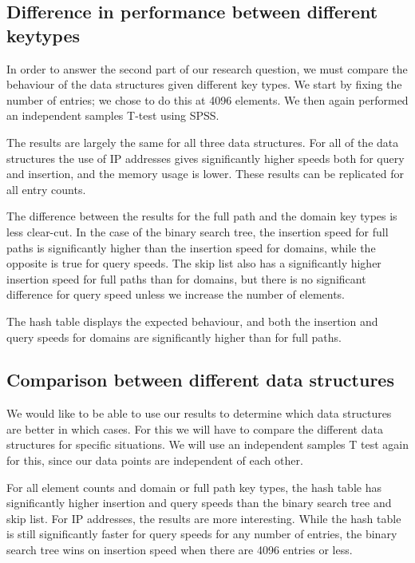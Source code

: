 \documentclass[12pt,a4paper]{article}
\begin{document}
    \subsection{Difference in performance between different keytypes}

    In order to answer the second part of our research question, we must compare the behaviour of
    the data structures given different key types.  We start by fixing the number of entries; we
    chose to do this at 4096 elements.  We then again performed an independent samples T-test
    using SPSS.

    The results are largely the same for all three data structures. For all of the data structures
    the use of IP addresses gives significantly higher speeds both for query and insertion, and the
    memory usage is lower.  These results can be replicated for all entry counts.

    The difference between the results for the full path and the domain key types is less clear-cut.
    In the case of the binary search tree, the insertion speed for full paths is significantly higher
    than the insertion speed for domains, while the opposite is true for query speeds.  The skip
    list also has a significantly higher insertion speed for full paths than for domains, but there
    is no significant difference for query speed unless we increase the number of elements.

    The hash table displays the expected behaviour, and both the insertion and query speeds for
    domains are significantly higher than for full paths.

    \subsection{Comparison between different data structures}

    We would like to be able to use our results to determine which data structures are better in
    which cases.  For this we will have to compare the different data structures for specific
    situations. We will use an independent samples T test again for this, since our data points are
    independent of each other.

    For all element counts and domain or full path key types, the hash table has significantly higher insertion
    and query speeds than the binary search tree and skip list.  For IP addresses, the results are
    more interesting.  While the hash table is still significantly faster for query speeds for any
    number of entries, the binary search tree wins on insertion speed when there are 4096 entries or
    less.
\end{document}
